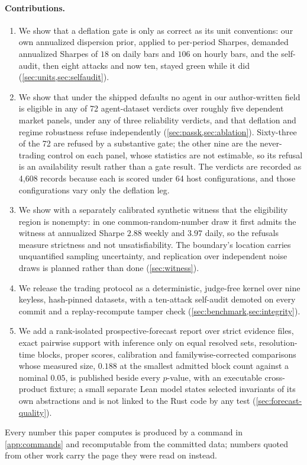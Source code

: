 \paragraph{Contributions.}
\begin{enumerate}[label=(\arabic*),leftmargin=*,itemsep=2pt]
\item We show that a deflation gate is only as correct as its unit conventions: our own annualized dispersion prior, applied to per-period Sharpes, demanded annualized Sharpes of $18$ on daily bars and $106$ on hourly bars, and the self-audit, then eight attacks and now ten, stayed green while it did (\cref{sec:units,sec:selfaudit}).
\item We show that under the shipped defaults no agent in our author-written field is eligible in any of 72 agent-dataset verdicts over roughly five dependent market panels, under any of three reliability verdicts, and that deflation and regime robustness refuse independently (\cref{sec:passk,sec:ablation}). Sixty-three of the 72 are refused by a substantive gate; the other nine are the never-trading control on each panel, whose statistics are not estimable, so its refusal is an availability result rather than a gate result. The verdicts are recorded as 4{,}608 records because each is scored under 64 host configurations, and those configurations vary only the deflation leg.
\item We show with a separately calibrated synthetic witness that the eligibility region is nonempty: in one common-random-number draw it first admits the witness at annualized Sharpe $2.88$ weekly and $3.97$ daily, so the refusals measure strictness and not unsatisfiability. The boundary's location carries unquantified sampling uncertainty, and replication over independent noise draws is planned rather than done (\cref{sec:witness}).
\item We release the trading protocol as a deterministic, judge-free kernel over nine keyless, hash-pinned datasets, with a ten-attack self-audit demoted on every commit and a replay-recompute tamper check (\cref{sec:benchmark,sec:integrity}).
\item We add a rank-isolated prospective-forecast report over strict evidence files, exact pairwise support with inference only on equal resolved sets, resolution-time blocks, proper scores, calibration and familywise-corrected comparisons whose measured size, $0.188$ at the smallest admitted block count against a nominal $0.05$, is published beside every $p$-value, with an executable cross-product fixture; a small separate Lean model states selected invariants of its own abstractions and is not linked to the Rust code by any test (\cref{sec:forecast-quality}).
\end{enumerate}
Every number this paper computes is produced by a command in \cref{app:commands} and recomputable from the committed data; numbers quoted from other work carry the page they were read on instead.
